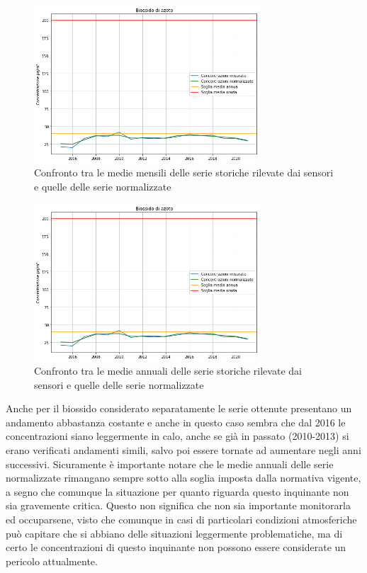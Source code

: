 \documentclass[a4paper,12pt]{report}
\begin{document}
\begin{figure}[h]
\centering
\includegraphics[width=0.75\textwidth]{no2_medie_annuali}
\caption{Confronto tra le medie mensili delle serie storiche rilevate dai sensori e quelle delle serie normalizzate}
\label{fig:no2_medie_annuali}
\end{figure}

\begin{figure}[h]
\centering
\includegraphics[width=0.75\textwidth]{no2_medie_annuali}
\caption{Confronto tra le medie annuali delle serie storiche rilevate dai sensori e quelle delle serie normalizzate}
\label{fig:no2_medie_annuali}
\end{figure}

Anche per il biossido considerato separatamente le serie ottenute presentano un andamento abbastanza costante e anche in questo caso sembra che dal 2016 le concentrazioni siano leggermente in calo, anche se già in passato (2010-2013) si erano verificati andamenti simili, salvo poi essere tornate ad aumentare negli anni successivi.
Sicuramente è importante notare che le medie annuali delle serie normalizzate rimangano sempre sotto alla soglia imposta dalla normativa vigente, a segno che comunque la situazione per quanto riguarda questo inquinante non sia gravemente critica. Questo non significa che non sia importante monitorarla ed occuparsene, visto che comunque in casi di particolari condizioni atmosferiche può capitare che si abbiano delle situazioni leggermente problematiche, ma di certo le concentrazioni di questo inquinante non possono essere considerate un pericolo attualmente.
\end{document}
